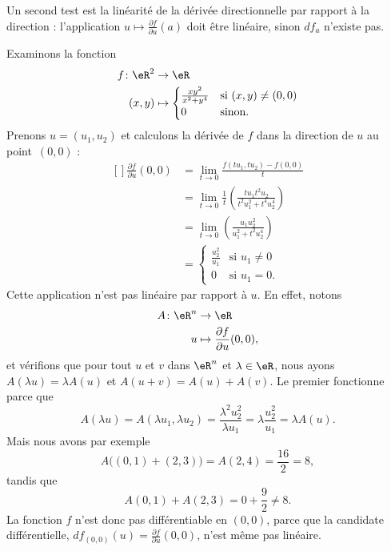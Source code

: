 Un second test est la linéarité de la dérivée directionnelle par rapport à la direction : l'application $u\mapsto\frac{ \partial f }{ \partial u }(a)$ doit être linéaire, sinon $df_a$ n'existe pas.

\begin{example}     \label{Exemple0046Diff}
Examinons la fonction
\begin{equation}
    \begin{aligned}
        f\colon \eR^2&\to \eR \\
        (x,y)&\mapsto \begin{cases}
    \frac{ xy^2 }{ x^2+y^4 }    &   \text{si $(x,y)\neq (0,0)$}\\
    0   &    \text{sinon}.
\end{cases}
    \end{aligned}
\end{equation}
Prenons $u=(u_1,u_2)$ et calculons la dérivée de $f$ dans la direction de $u$ au point~$(0,0)$ :
\begin{equation}
    \begin{aligned}[]
        \frac{ \partial f }{ \partial u }(0,0)  
            &=\lim_{t\to 0}\frac{ f(tu_1,tu_2)-f(0,0) }{ t }\\
            &=\lim_{t\to 0}\frac{1}{ t }\left( \frac{ tu_1t^2u_2 }{ t^2u_1^2+t^4u_2^4 } \right)\\
            &=\lim_{t\to 0}\left( \frac{ u_1u_2^2 }{ u_1^2+t^2u_2^4 } \right)\\
            &=\begin{cases}
    \frac{ u_2^2 }{ u_1 }   &   \text{si $u_1\neq 0$}\\
    0   &    \text{si $u_1=0$}.
\end{cases}
    \end{aligned}
\end{equation}
Cette application n'est pas linéaire par rapport à $u$. En effet, notons
\begin{equation}
    \begin{aligned}
        A\colon \eR^n&\to \eR \\
        u&\mapsto \frac{ \partial f }{ \partial u }(0,0), 
    \end{aligned}
\end{equation}
et vérifions que pour tout $u$ et $v$ dans $\eR^n$ et $\lambda\in\eR$, nous ayons $A(\lambda u)=\lambda A(u)$ et $A(u+v)=A(u)+A(v)$. Le premier fonctionne parce que
\begin{equation}
    A(\lambda u)=A(\lambda u_1,\lambda u_2)=\frac{ \lambda^2 u_2^2 }{ \lambda u_1 }=\lambda\frac{ u_2^2 }{ u_1 }=\lambda A(u).
\end{equation}
Mais nous avons par exemple
\begin{equation}
    A\big( (0,1)+(2,3) \big)=A(2,4)=\frac{ 16 }{ 2 }=8,
\end{equation}
tandis que
\begin{equation}
    A(0,1)+A(2,3)=0+\frac{ 9 }{ 2 }\neq 8.
\end{equation}
La fonction $f$ n'est donc pas différentiable en $(0,0)$, parce que la candidate différentielle, $df_{(0,0)}(u)=\frac{ \partial f }{ \partial u }(0,0)$, n'est même pas linéaire.


\end{example}
